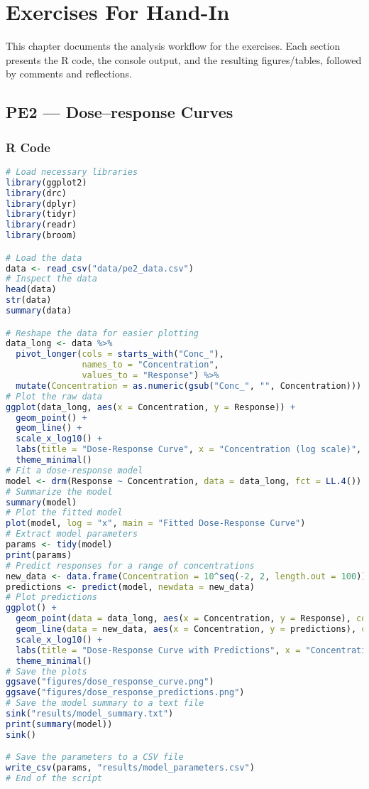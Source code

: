 \chapter{Exercises For Hand-In}
\setlength{\headheight}{12.71342pt}
\addtolength{\topmargin}{-0.71342pt}

This chapter documents the analysis workflow for the exercises. 
Each section presents the R code, the console output, and the resulting 
figures/tables, followed by comments and reflections.

\section{PE2 — Dose–response Curves}
\subsection{R Code}
\begin{lstlisting}[language=R, caption={R code for PE2 — Dose–response Curves}, label={lst:pe2_code}]
# Load necessary libraries
library(ggplot2)
library(drc)
library(dplyr)
library(tidyr)
library(readr)
library(broom)

# Load the data
data <- read_csv("data/pe2_data.csv")
# Inspect the data
head(data)
str(data)
summary(data)

# Reshape the data for easier plotting
data_long <- data %>%
  pivot_longer(cols = starts_with("Conc_"), 
               names_to = "Concentration", 
               values_to = "Response") %>%
  mutate(Concentration = as.numeric(gsub("Conc_", "", Concentration)))
# Plot the raw data
ggplot(data_long, aes(x = Concentration, y = Response)) +
  geom_point() +
  geom_line() +
  scale_x_log10() +
  labs(title = "Dose-Response Curve", x = "Concentration (log scale)", y = "Response") +
  theme_minimal()
# Fit a dose-response model
model <- drm(Response ~ Concentration, data = data_long, fct = LL.4())
# Summarize the model
summary(model)
# Plot the fitted model
plot(model, log = "x", main = "Fitted Dose-Response Curve")
# Extract model parameters
params <- tidy(model)
print(params)
# Predict responses for a range of concentrations
new_data <- data.frame(Concentration = 10^seq(-2, 2, length.out = 100))
predictions <- predict(model, newdata = new_data)
# Plot predictions
ggplot() +
  geom_point(data = data_long, aes(x = Concentration, y = Response), color = "blue") +
  geom_line(data = new_data, aes(x = Concentration, y = predictions), color = "red") +
  scale_x_log10() +
  labs(title = "Dose-Response Curve with Predictions", x = "Concentration (log scale)", y = "Response") +
  theme_minimal()
# Save the plots
ggsave("figures/dose_response_curve.png")
ggsave("figures/dose_response_predictions.png")
# Save the model summary to a text file
sink("results/model_summary.txt")
print(summary(model))
sink()

# Save the parameters to a CSV file
write_csv(params, "results/model_parameters.csv")
# End of the script
\end{lstlisting}

